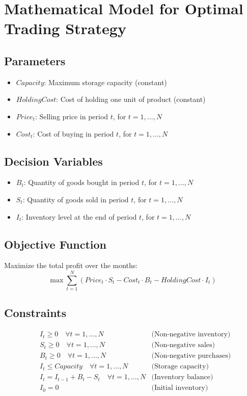 \documentclass{article}
\begin{document}
\section*{Mathematical Model for Optimal Trading Strategy}

\subsection*{Parameters}
\begin{itemize}
    \item $Capacity$: Maximum storage capacity (constant)
    \item $HoldingCost$: Cost of holding one unit of product (constant)
    \item $Price_t$: Selling price in period $t$, for $t = 1, \ldots, N$
    \item $Cost_t$: Cost of buying in period $t$, for $t = 1, \ldots, N$
\end{itemize}

\subsection*{Decision Variables}
\begin{itemize}
    \item $B_t$: Quantity of goods bought in period $t$, for $t = 1, \ldots, N$
    \item $S_t$: Quantity of goods sold in period $t$, for $t = 1, \ldots, N$
    \item $I_t$: Inventory level at the end of period $t$, for $t = 1, \ldots, N$
\end{itemize}

\subsection*{Objective Function}
Maximize the total profit over the months:
\[
\max \sum_{t=1}^{N} \left( Price_t \cdot S_t - Cost_t \cdot B_t - HoldingCost \cdot I_t \right)
\]

\subsection*{Constraints}
\begin{align}
    & I_t \geq 0 \quad \forall t = 1, \ldots, N & \text{(Non-negative inventory)} \\
    & S_t \geq 0 \quad \forall t = 1, \ldots, N & \text{(Non-negative sales)} \\
    & B_t \geq 0 \quad \forall t = 1, \ldots, N & \text{(Non-negative purchases)} \\
    & I_t \leq Capacity \quad \forall t = 1, \ldots, N & \text{(Storage capacity)} \\
    & I_t = I_{t-1} + B_t - S_t \quad \forall t = 1, \ldots, N & \text{(Inventory balance)} \\
    & I_0 = 0 & \text{(Initial inventory)}
\end{align}
\end{document}

